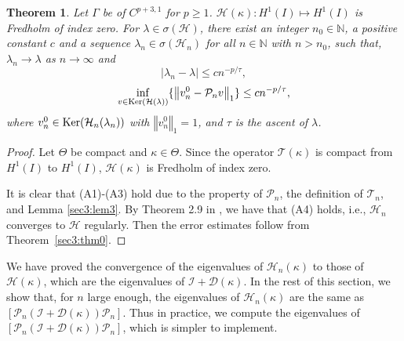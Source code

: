 \documentclass{article}
\newtheorem{theorem}{Theorem}[section]
\newcommand{\abs}[1]{\left\vert#1\right\vert}
\newcommand{\norm}[1]{\left\Vert#1\right\Vert}
\begin{document}
	\begin{theorem}\label{sec3:thm2}
		Let $\Gamma$ be of $C^{p+3,1}$ for $p\geq1$. $\mathcal{H}(\kappa):H^1(I)\mapsto H^1(I)$ is Fredholm of index zero. For $\lambda\in\sigma(\mathcal{H})$,
		there exist an integer $n_0\in\mathbb{N}$, a positive constant $c$  and a sequence $\lambda_n\in\sigma(\mathcal{H}_n)$ for all $n\in\mathbb{N}$ with $n>n_0$, such that, 
		$\lambda_n\to\lambda$ as $n\to\infty$ and 
		\begin{equation*}
			\abs{\lambda_n-\lambda}\leq cn^{-p/\tau},
		\end{equation*}
		\begin{equation*}
			\inf\limits_{v\in{\rm Ker}(\mathcal{H}(\lambda))}\{\norm{v_n^0-\mathcal{P}_nv}_{1}\}\leq c n^{-p/\tau},
		\end{equation*}
		where $v_n^0\in{\rm Ker}(\mathcal{H}_n(\lambda_n))$ with $\norm{v_n^0}_{1}=1$, and $\tau$ is the ascent of $\lambda$.
	\end{theorem}
	\begin{proof}
		
		Let $\Theta$ be compact and $\kappa \in \Theta$. Since  the  operator $\mathcal{T}(\kappa)$ is compact from $H^{1}(I)$ to $H^{1}(I)$, $\mathcal{H}(\kappa)$ is Fredholm of index zero.
		
		It is clear that (A1)-(A3) hold due to the property of $\mathcal{P}_n$, the definition of $\mathcal{T}_n$, and Lemma \ref{sec3:lem3}. By Theorem 2.9 in \cite{GongSun2023ETNA}, we have that (A4) holds, i.e., $\mathcal{H}_n$ converges to $\mathcal{H}$ regularly. Then the error estimates follow from Theorem~\ref{sec3:thm0}.
	\end{proof}
	
	We have proved the convergence of the eigenvalues of $\mathcal{H}_{n}(\kappa)$ to those of $\mathcal{H}(\kappa)$, which are the eigenvalues of $\mathcal{I}+\mathcal{D}(\kappa)$. In the rest of this section, we show that, for $n$ large enough, the eigenvalues of $\mathcal{H}_{n}(\kappa)$ are the same as $[\mathcal{P}_n(\mathcal{I}+\mathcal{D}(\kappa))\mathcal{P}_n]$. Thus in practice, we compute the eigenvalues of $[\mathcal{P}_n(\mathcal{I}+\mathcal{D}(\kappa))\mathcal{P}_n]$, which is simpler to implement. 
	
\end{document}
